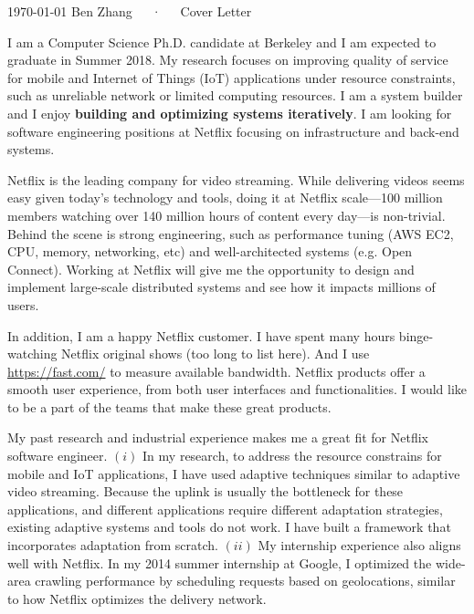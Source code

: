 \documentclass[11pt, letterpaper]{awesome-cv}
\begin{document}
\makecvheader[R]
\makecvfooter
  {\today}
  {Ben Zhang~~~·~~~Cover Letter}
  {}

\makelettertitle

\begin{cvletter}


  I am a Computer Science Ph.D. candidate at Berkeley and I am expected to
  graduate in Summer 2018. My research focuses on improving quality of service
  for mobile and Internet of Things (IoT) applications under resource
  constraints, such as unreliable network or limited computing resources. I am a
  system builder and I enjoy \textbf{building and optimizing systems
    iteratively}. I am looking for software engineering positions at Netflix
  focusing on infrastructure and back-end systems.


  Netflix is the leading company for video streaming. While delivering videos
  seems easy given today's technology and tools, doing it at Netflix scale---100
  million members watching over 140 million hours of content every day---is
  non-trivial. Behind the scene is strong engineering, such as performance
  tuning (AWS EC2, CPU, memory, networking, etc) and well-architected systems
  (e.g. Open Connect). Working at Netflix will give me the opportunity to design
  and implement large-scale distributed systems and see how it impacts millions
  of users.

  In addition, I am a happy Netflix customer. I have spent many hours
  binge-watching Netflix original shows (too long to list here). And I use
  \url{https://fast.com/} to measure available bandwidth. Netflix products offer
  a smooth user experience, from both user interfaces and functionalities. I
  would like to be a part of the teams that make these great products.


  My past research and industrial experience makes me a great fit for Netflix
  software engineer. $(i)$ In my research, to address the resource constrains
  for mobile and IoT applications, I have used adaptive techniques similar to
  adaptive video streaming. Because the uplink is usually the bottleneck for
  these applications, and different applications require different adaptation
  strategies, existing adaptive systems and tools do not work. I have built a
  framework that incorporates adaptation from scratch. $(ii)$ My internship
  experience also aligns well with Netflix. In my 2014 summer internship at
  Google, I optimized the wide-area crawling performance by scheduling requests
  based on geolocations, similar to how Netflix optimizes the delivery network.


\end{cvletter}
\end{document}
